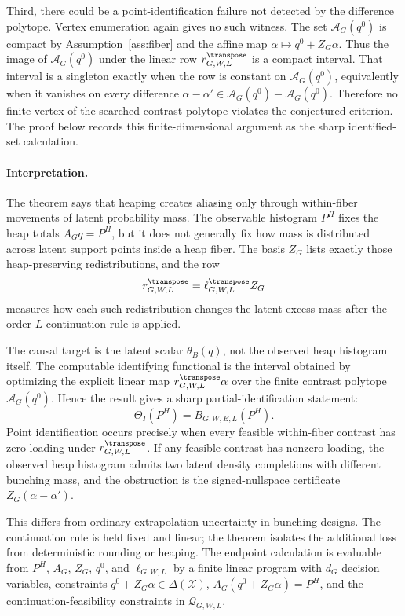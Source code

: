Third, there could be a point-identification failure not detected by the difference polytope.  Vertex enumeration again gives no such witness.  The set \(\mathcal{A}_G(q^0)\) is compact by Assumption~\ref{ass:fiber} and the affine map \(\alpha\mapsto q^0+Z_G\alpha\).  Thus the image of \(\mathcal{A}_G(q^0)\) under the linear row \(r_{G,W,L}^{\transpose}\) is a compact interval.  That interval is a singleton exactly when the row is constant on \(\mathcal{A}_G(q^0)\), equivalently when it vanishes on every difference \(\alpha-\alpha'\in\mathcal{A}_G(q^0)-\mathcal{A}_G(q^0)\).  Therefore no finite vertex of the searched contrast polytope violates the conjectured criterion.  The proof below records this finite-dimensional argument as the sharp identified-set calculation.

\paragraph{Interpretation.}
The theorem says that heaping creates aliasing only through within-fiber movements of latent probability mass.  The observable histogram \(P^H\) fixes the heap totals \(A_Gq=P^H\), but it does not generally fix how mass is distributed across latent support points inside a heap fiber.  The basis \(Z_G\) lists exactly those heap-preserving redistributions, and the row
\[
r_{G,W,L}^{\transpose}=\ell_{G,W,L}^{\transpose}Z_G
\]
measures how each such redistribution changes the latent excess mass after the order-\(L\) continuation rule is applied.

The causal target is the latent scalar \(\theta_B(q)\), not the observed heap histogram itself.  The computable identifying functional is the interval obtained by optimizing the explicit linear map \(r_{G,W,L}^{\transpose}\alpha\) over the finite contrast polytope \(\mathcal{A}_G(q^0)\).  Hence the result gives a sharp partial-identification statement:
\[
\Theta_I(P^H)=B_{G,W,E,L}(P^H).
\]
Point identification occurs precisely when every feasible within-fiber contrast has zero loading under \(r_{G,W,L}^{\transpose}\).  If any feasible contrast has nonzero loading, the observed heap histogram admits two latent density completions with different bunching mass, and the obstruction is the signed-nullspace certificate \(Z_G(\alpha-\alpha')\).

This differs from ordinary extrapolation uncertainty in bunching designs.  The continuation rule is held fixed and linear; the theorem isolates the additional loss from deterministic rounding or heaping.  The endpoint calculation is evaluable from \(P^H\), \(A_G\), \(Z_G\), \(q^0\), and \(\ell_{G,W,L}\) by a finite linear program with \(d_G\) decision variables, constraints \(q^0+Z_G\alpha\in\Delta(\mathcal{X})\), \(A_G(q^0+Z_G\alpha)=P^H\), and the continuation-feasibility constraints in \(\mathcal{Q}_{G,W,L}\).


